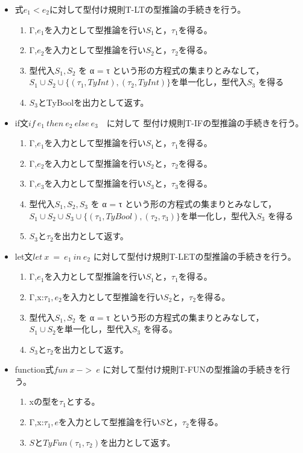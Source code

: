 \documentclass[a4paper,11pt,oneside,openany]{jsarticle}
\begin{document}
  \begin{itemize}
    \item 式$e_1 <e_2$に対して型付け規則T-LTの型推論の手続きを行う。
    \begin{enumerate}
      \item Γ,$e_1 を入力として型推論を行いS_1と，τ_1$を得る。
      \item Γ,$e_2 を入力として型推論を行いS_2と，τ_2$を得る。
      \item 型代入$S_1,S_2$ を α = τ という形の方程式の集まりとみなして，$S_1∪S_2∪\{(τ_1,TyInt),(τ_2,TyInt)\} を単一化し，型代入S_3$ を得る
      \item $S_3$とTyBoolを出力として返す。
    \end{enumerate}
  \end{itemize}
  \begin{itemize}
    \item if文$if\ e_1\ then\ e_2\ else\ e_3$　に対して 型付け規則T-IFの型推論の手続きを行う。
    \begin{enumerate}
      \item Γ,$e_1 を入力として型推論を行いS_1と，τ_1$を得る。
      \item Γ,$e_2 を入力として型推論を行いS_2と，τ_2$を得る。
      \item Γ,$e_3 を入力として型推論を行いS_3と，τ_3$を得る。
      \item 型代入$S_1,S_2,S_3$ を α = τ という形の方程式の集まりとみなして，$S_1∪S_2∪S_3∪\{(τ_1,TyBool),(τ_2,τ_3)\} を単一化し，型代入S_3$ を得る
      \item $S_3とτ_2$を出力として返す。
    \end{enumerate}
  \end{itemize}
  \begin{itemize}
    \item let文$let\ x\ =\ e_1\ in\ e_2$ に対して型付け規則T-LETの型推論の手続きを行う。
    \begin{enumerate}
      \item Γ,$e_1 を入力として型推論を行いS_1と，τ_1$を得る。
      \item Γ,x:$τ_1,e_2 を入力として型推論を行いS_2と，τ_2$を得る。
      \item 型代入$S_1,S_2$ を α = τ という形の方程式の集まりとみなして，$S_1∪S_2 を単一化し，型代入S_3$ を得る。
      \item $S_3とτ_2$を出力として返す。
    \end{enumerate}
  \end{itemize}
  \begin{itemize}
    \item function式$fun\ x\ ->\ e$ に対して型付け規則T-FUNの型推論の手続きを行う。
    \begin{enumerate}
      \item xの型を$τ_1$とする。
      \item Γ,x:$τ_1,eを入力として型推論を行いSと，τ_2$を得る。
      \item $SとTyFun(τ_1,τ_2)$を出力として返す。
    \end{enumerate}
  \end{itemize}
\end{document}

